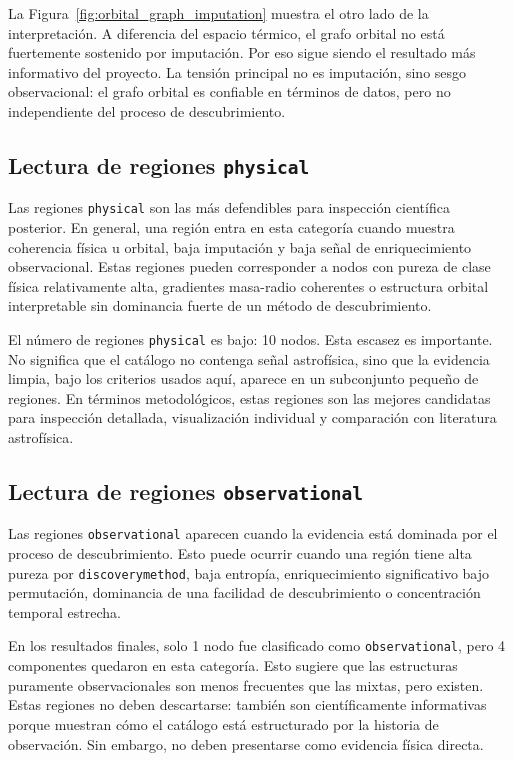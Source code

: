 La Figura~\ref{fig:orbital_graph_imputation} muestra el otro lado de la interpretación. A diferencia del espacio térmico, el grafo orbital no está fuertemente sostenido por imputación. Por eso sigue siendo el resultado más informativo del proyecto. La tensión principal no es imputación, sino sesgo observacional: el grafo orbital es confiable en términos de datos, pero no independiente del proceso de descubrimiento.

\subsection*{Lectura de regiones \texttt{physical}}

Las regiones \texttt{physical} son las más defendibles para inspección científica posterior. En general, una región entra en esta categoría cuando muestra coherencia física u orbital, baja imputación y baja señal de enriquecimiento observacional. Estas regiones pueden corresponder a nodos con pureza de clase física relativamente alta, gradientes masa-radio coherentes o estructura orbital interpretable sin dominancia fuerte de un método de descubrimiento.

El número de regiones \texttt{physical} es bajo: 10 nodos. Esta escasez es importante. No significa que el catálogo no contenga señal astrofísica, sino que la evidencia limpia, bajo los criterios usados aquí, aparece en un subconjunto pequeño de regiones. En términos metodológicos, estas regiones son las mejores candidatas para inspección detallada, visualización individual y comparación con literatura astrofísica.

\subsection*{Lectura de regiones \texttt{observational}}

Las regiones \texttt{observational} aparecen cuando la evidencia está dominada por el proceso de descubrimiento. Esto puede ocurrir cuando una región tiene alta pureza por \texttt{discoverymethod}, baja entropía, enriquecimiento significativo bajo permutación, dominancia de una facilidad de descubrimiento o concentración temporal estrecha.

En los resultados finales, solo 1 nodo fue clasificado como \texttt{observational}, pero 4 componentes quedaron en esta categoría. Esto sugiere que las estructuras puramente observacionales son menos frecuentes que las mixtas, pero existen. Estas regiones no deben descartarse: también son científicamente informativas porque muestran cómo el catálogo está estructurado por la historia de observación. Sin embargo, no deben presentarse como evidencia física directa.

